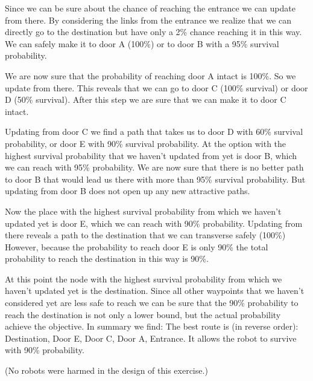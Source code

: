 Since we can be sure about the chance of reaching the entrance we can update from there. By considering the links from the entrance we realize that we can directly go to the destination but have only a 2\% chance reaching it in this way. We can safely make it to door A (100\%) or to door B with a 95\% survival probability.

We are now sure that the probability of reaching door A intact is 100\%. So we update from there. This reveals that we can go to door C (100\% survival) or door D (50\% survival). After this step we are sure that we can make it to door C intact. 

Updating from door C we find a path that takes us to door D with 60\% survival probability, or door E with 90\% survival probability. At the option with the highest survival probability that we haven't updated from yet is door B, which we can reach with 95\% probability. We are now sure that there is no better path to door B that would lead us there with more than 95\% survival probability. But updating from door B does not open up any new attractive paths. 

Now the place with the highest survival probability from which we haven't updated yet is door E, which we can reach with 90\% probability. Updating from there reveals a path to the destination that we can transverse safely (100\%) However, because the probability to reach door E is only 90\% the total probability to reach the destination in this way is 90\%. 

At this point the node with the highest survival probability from which we haven't updated yet is the destination. Since all other waypoints that we haven't considered yet are less safe to reach we can be sure that the 90\% probability to reach the destination is not only a lower bound, but the actual probability achieve the objective.  
In summary we find: The best route is (in reverse order): Destination, Door E, Door C, Door A, Entrance. It allows the robot to survive with 90\% probability.

(No robots were harmed in the design of this exercise.)
